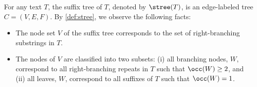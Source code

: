 

For any text $T$, the suffix tree of $T$, denoted by $\stree(T)$, is an edge-labeled tree $C = (V, E, F)$. 
By \cref{def:stree}, we observe the following facts: 
\begin{itemize}
\item The node set $V$ of the suffix tree corresponds to the set of right-branching substrings in $T$. 
  
\item The nodes of $V$ are classified into two subsets: (i) all branching nodes, $W$, correspond to all right-branching repeats in $T$ such that $\occ(W)\ge 2$, and (ii) all leaves, $W$, correspond to all suffixes of $T$ such that $\occ(W) = 1$. 
  
\end{itemize}


